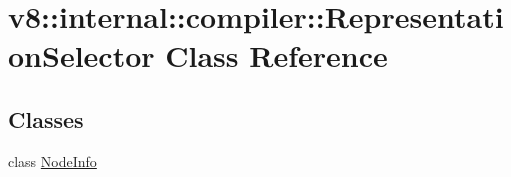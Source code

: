 \hypertarget{classv8_1_1internal_1_1compiler_1_1RepresentationSelector}{}\section{v8\+:\+:internal\+:\+:compiler\+:\+:Representation\+Selector Class Reference}
\label{classv8_1_1internal_1_1compiler_1_1RepresentationSelector}
\subsection*{Classes}
\begin{DoxyCompactItemize}
\item 
class \mbox{\hyperlink{classv8_1_1internal_1_1compiler_1_1RepresentationSelector_1_1NodeInfo}{Node\+Info}}
\end{DoxyCompactItemize}
